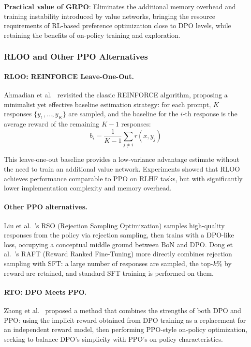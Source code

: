 \begin{solutionbox}
\textbf{Practical value of GRPO}:
Eliminates the additional memory overhead and training instability introduced by value networks,
bringing the resource requirements of RL-based preference optimization close to DPO levels,
while retaining the benefits of on-policy training and exploration.
\end{solutionbox}

\subsubsection{RLOO and Other PPO Alternatives}
\label{sec:t2-rloo}

\paragraph{RLOO: REINFORCE Leave-One-Out.}
Ahmadian et al.\ \cite{ahmadian2024rloo} revisited the classic REINFORCE algorithm,
proposing a minimalist yet effective baseline estimation strategy:
for each prompt, $K$ responses $\{y_1, \ldots, y_K\}$ are sampled,
and the baseline for the $i$-th response is the average reward of the remaining $K-1$ responses:
\begin{equation}
\label{eq:pref:rloo}
b_i = \frac{1}{K-1} \sum_{j \neq i} r(x, y_j)
\end{equation}

This leave-one-out baseline provides a low-variance advantage estimate
without the need to train an additional value network.
Experiments showed that RLOO achieves performance comparable to PPO on RLHF tasks,
but with significantly lower implementation complexity and memory overhead.

\paragraph{Other PPO alternatives.}
Liu et al.\ \cite{liu2023rso}'s RSO (Rejection Sampling Optimization)
samples high-quality responses from the policy via rejection sampling,
then trains with a DPO-like loss,
occupying a conceptual middle ground between BoN and DPO.
Dong et al.\ \cite{dong2023raft}'s RAFT (Reward Ranked Fine-Tuning)
more directly combines rejection sampling with SFT:
a large number of responses are sampled, the top-$k\%$ by reward are retained,
and standard SFT training is performed on them.

\paragraph{RTO: DPO Meets PPO.}
Zhong et al.\ \cite{zhong2024rto} proposed a method that combines the strengths of both DPO and PPO:
using the implicit reward obtained from DPO training as a replacement for an independent reward model,
then performing PPO-style on-policy optimization,
seeking to balance DPO's simplicity with PPO's on-policy characteristics.

